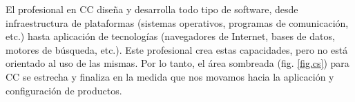 El profesional en \ac{CC} diseña y desarrolla todo tipo de software, desde infraestructura de plataformas (sistemas operativos, programas de comunicación, etc.) hasta aplicación de tecnologí­as (navegadores de Internet, bases de datos, motores de búsqueda, etc.). Este profesional crea estas capacidades, pero no está orientado al uso de las mismas. Por lo tanto, el área sombreada (fig. \ref{fig.cs}) para \ac{CC} se estrecha y finaliza en la medida que nos movamos hacia la aplicación y configuración de productos.
